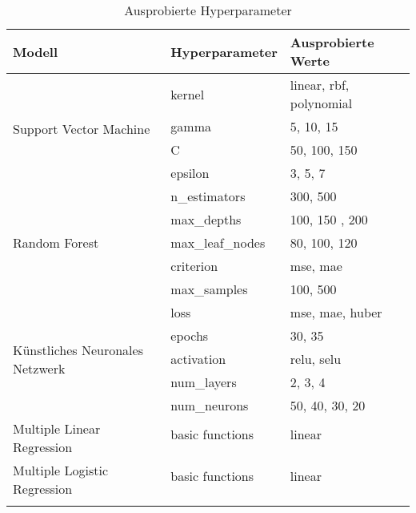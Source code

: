 \begin{table}[ht]
  \caption{\label{tab:hyperparameter} Ausprobierte Hyperparameter}
  \begin{tabular}{ p{4cm}  p{4cm}  p{5cm} }
    \toprule
    Modell                                               & Hyperparameter   & Ausprobierte Werte      \\
    \midrule
    \multirow{4}{7em}{Support Vector Machine}            & kernel           & linear, rbf, polynomial \\
                                                         & gamma            & 5, 10, 15               \\
                                                         & C                & 50, 100, 150            \\
                                                         & epsilon          & 3, 5, 7                 \\
    \midrule
    \multirow{5}{7em}{Random Forest}                     & n\_estimators    & 300, 500                \\
                                                         & max\_depths      & 100, 150 , 200          \\
                                                         & max\_leaf\_nodes & 80, 100, 120            \\
                                                         & criterion        & mse, mae                \\
                                                         & max\_samples     & 100, 500                \\
    \midrule
    \multirow{5}{7em}{K\"unstliches Neuronales Netzwerk} & loss             & mse, mae, huber         \\
                                                         & epochs           & 30, 35                  \\
                                                         & activation       & relu, selu              \\
                                                         & num\_layers      & 2, 3, 4                 \\
                                                         & num\_neurons     & 50, 40, 30, 20          \\
    \midrule
    \multirow{2}{7em}{Multiple Linear Regression}        & basic functions  & linear                  \\
                                                         &                  &                         \\
    \midrule
    \multirow{2}{7em}{Multiple Logistic Regression}      & basic functions  & linear                  \\
                                                         &                  &                         \\
                                                         &                  &                         \\
    \bottomrule
  \end{tabular}

\end{table}

